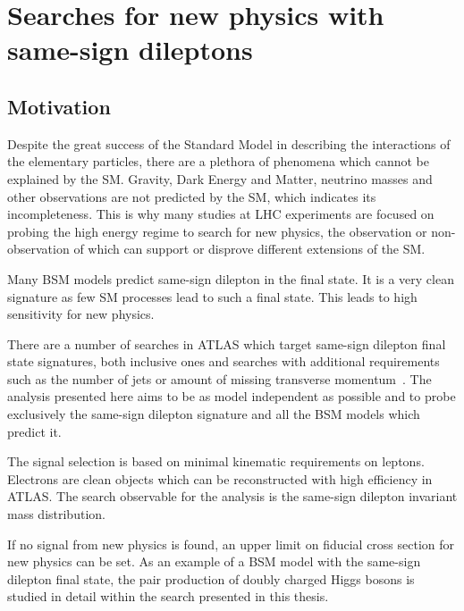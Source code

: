 \chapter{Searches for new physics with same-sign dileptons}
\label{chap:SS}
\section{Motivation}


Despite the great success of the Standard Model in describing the interactions of the elementary particles, there are a plethora of phenomena
which cannot be explained by the SM. Gravity, Dark Energy and Matter, neutrino masses and other observations are not predicted by the
SM, which indicates its incompleteness.
This is why many studies at LHC experiments are focused on probing the high energy regime to search for new physics, 
the observation or non-observation of which can support or disprove different extensions of the SM.

Many BSM models predict same-sign dilepton in the final state.
It is a very clean signature as few SM processes lead to such a final state.
This leads to high sensitivity for new physics.

There are a number of searches in ATLAS which target same-sign dilepton final state signatures, both inclusive ones and searches with additional requirements such as the number of jets or amount of missing transverse momentum~\cite{heavy_majorana_neutrino_paper,floderus_paper,Aad:2014pda}.
The analysis presented here aims to be as model independent as possible and to probe exclusively the same-sign dilepton signature and all the BSM models which predict it.

The signal selection is based on minimal kinematic requirements on leptons.
Electrons are clean objects which can be reconstructed with high efficiency in ATLAS.
The search observable for the analysis is the same-sign dilepton invariant mass distribution.

If no signal from new physics is found, an upper limit on fiducial cross section for new physics can be set.
As an example of a BSM model with the same-sign dilepton final state, the pair production of doubly charged Higgs bosons is studied in detail within the search presented in this thesis.


